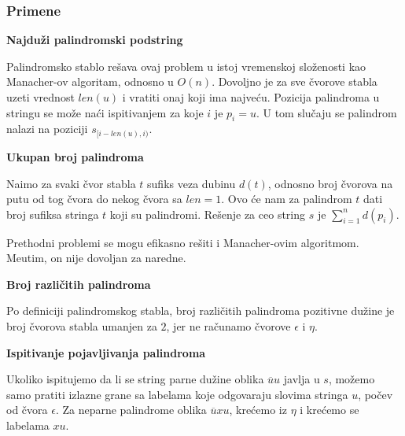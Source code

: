 \subsubsection{Primene}

\noindent
\textbf{Najdu\v zi palindromski podstring}

Palindromsko stablo re\v sava ovaj problem u istoj vremenskoj slo\v zenosti kao Manacher-ov algoritam, odnosno u $O(n)$. Dovoljno je za sve \v cvorove stabla uzeti vrednost $len(u)$ i vratiti onaj koji ima najve\' cu. Pozicija palindroma u stringu se mo\v ze na\' ci ispitivanjem za koje $i$ je $p_i = u$. U tom slu\v caju se palindrom nalazi na poziciji $s_{[i-len(u), i)}$.

\noindent
\textbf{Ukupan broj palindroma}

Na\dj imo za svaki \v cvor stabla $t$ sufiks veza dubinu $d(t)$, odnosno broj \v cvorova na putu od tog \v cvora do nekog \v cvora sa $len = 1$. Ovo \' ce nam za palindrom $t$ dati broj sufiksa stringa $t$ koji su palindromi. Re\v senje za ceo string $s$ je $\sum_{i=1}^n d(p_i)$.

Prethodni problemi se mogu efikasno re\v siti i Manacher-ovim algoritmom. Me\dj utim, on nije dovoljan za naredne.

\noindent
\textbf{Broj razli\v citih palindroma}

Po definiciji palindromskog stabla, broj razli\v citih palindroma pozitivne du\v zine je broj \v cvorova stabla umanjen za $2$, jer ne ra\v cunamo \v cvorove $\epsilon$ i $\eta$.

\noindent
\textbf{Ispitivanje pojavljivanja palindroma}

Ukoliko ispitujemo da li se string parne du\v zine oblika $\overline{u}u$ javlja u $s$, mo\v zemo samo pratiti izlazne grane sa labelama koje odgovaraju slovima stringa $u$, po\v cev od \v cvora $\epsilon$. Za neparne palindrome oblika $\overline{u}xu$, kre\' cemo iz $\eta$ i kre\' cemo se labelama $xu$.